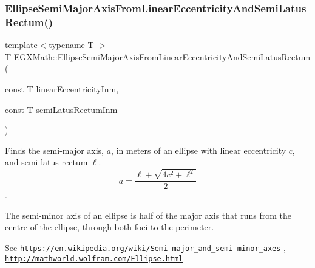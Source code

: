 \mbox{\label{group___e_g_x_math-_geometry-2_d-_ellipse-_semi_major_axis_gad5fde13ad96aede92a1c476d373bc295}} 
\subsubsection{\texorpdfstring{Ellipse\+Semi\+Major\+Axis\+From\+Linear\+Eccentricity\+And\+Semi\+Latus\+Rectum()}{EllipseSemiMajorAxisFromLinearEccentricityAndSemiLatusRectum()}}
{\footnotesize\ttfamily template$<$typename T $>$ \\
T E\+G\+X\+Math\+::\+Ellipse\+Semi\+Major\+Axis\+From\+Linear\+Eccentricity\+And\+Semi\+Latus\+Rectum (\begin{DoxyParamCaption}\item[{const T}]{linear\+Eccentricity\+Inm,  }\item[{const T}]{semi\+Latus\+Rectum\+Inm }\end{DoxyParamCaption})}



Finds the semi-\/major axis, $a$, in meters of an ellipse with linear eccentricity $c$, and semi-\/latus rectum $\ell$. \[ a=\dfrac{\ell+\sqrt{4c^2+\ell^2}}{2} \]. 

The semi-\/minor axis of an ellipse is half of the major axis that runs from the centre of the ellipse, through both foci to the perimeter.

See \href{https://en.wikipedia.org/wiki/Semi-major_and_semi-minor_axes}{\tt https\+://en.\+wikipedia.\+org/wiki/\+Semi-\/major\+\_\+and\+\_\+semi-\/minor\+\_\+axes} , \href{http://mathworld.wolfram.com/Ellipse.html}{\tt http\+://mathworld.\+wolfram.\+com/\+Ellipse.\+html}



